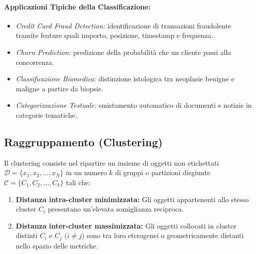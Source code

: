 \paragraph{Applicazioni Tipiche della Classificazione:}
\begin{itemize}
    \item \textit{Credit Card Fraud Detection:} identificazione di transazioni fraudolente tramite feature quali importo, posizione, timestamp e frequenza.
    \item \textit{Churn Prediction:} predizione della probabilit\`a che un cliente passi alla concorrenza.
    \item \textit{Classificazione Biomedica:} distinzione istologica tra neoplasie benigne e maligne a partire da biopsie.
    \item \textit{Categorizzazione Testuale:} smistamento automatico di documenti e notizie in categorie tematiche.
\end{itemize}

\FloatBarrier
\subsection{Raggruppamento (Clustering)}
Il clustering consiste nel ripartire un insieme di oggetti non etichettati $\mathcal{D} = \{x_1, x_2, \dots, x_N\}$ in un numero $k$ di gruppi o partizioni disgiunte $\mathcal{C} = \{C_1, C_2, \dots, C_k\}$ tali che:
\begin{enumerate}
    \item \textbf{Distanza intra-cluster minimizzata:} Gli oggetti appartenenti allo stesso cluster $C_i$ presentano un'elevata somiglianza reciproca.
    \item \textbf{Distanza inter-cluster massimizzata:} Gli oggetti collocati in cluster distinti $C_i$ e $C_j$ ($i \neq j$) sono tra loro eterogenei o geometricamente distanti nello spazio delle metriche.
\end{enumerate}

